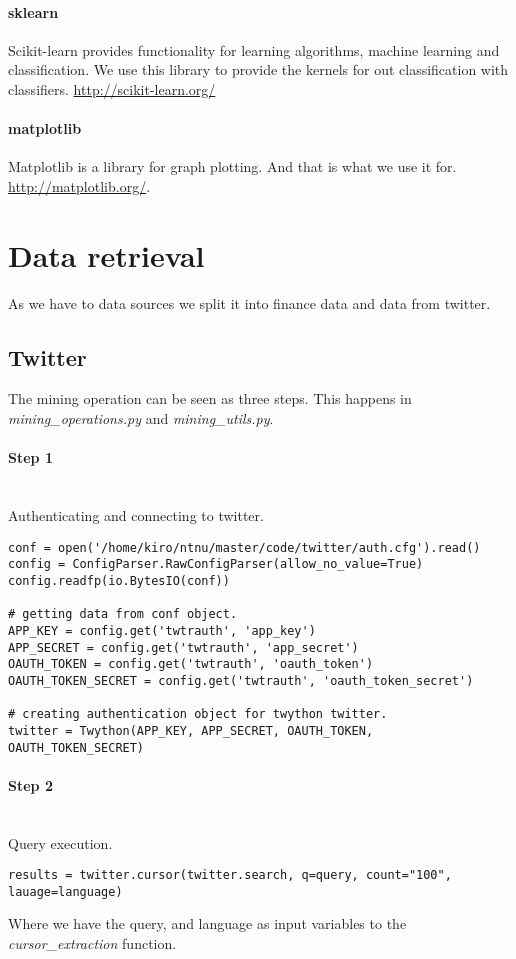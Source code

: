 \paragraph{sklearn}
Scikit-learn provides functionality for learning algorithms, machine learning
and classification. We use this library to provide the kernels for out
classification with classifiers. \url{http://scikit-learn.org/}

\paragraph{matplotlib}
Matplotlib is a library for graph plotting. And that is what we use it for.
\url{http://matplotlib.org/}.
 
\section{Data retrieval}\label{data:data_retrieval}
As we have to data sources we split it into finance data and data from twitter.

\subsection{Twitter}
The mining operation can be seen as three steps. This happens in
\textit{mining\_operations.py} and \textit{mining\_utils.py}.

\paragraph{Step 1}
\hspace{0pt}\\
Authenticating and connecting to twitter. 
\begin{verbatim}
conf = open('/home/kiro/ntnu/master/code/twitter/auth.cfg').read()
config = ConfigParser.RawConfigParser(allow_no_value=True)
config.readfp(io.BytesIO(conf))

# getting data from conf object.
APP_KEY = config.get('twtrauth', 'app_key')
APP_SECRET = config.get('twtrauth', 'app_secret')
OAUTH_TOKEN = config.get('twtrauth', 'oauth_token')
OAUTH_TOKEN_SECRET = config.get('twtrauth', 'oauth_token_secret')

# creating authentication object for twython twitter.
twitter = Twython(APP_KEY, APP_SECRET, OAUTH_TOKEN, OAUTH_TOKEN_SECRET)
\end{verbatim}

\paragraph{Step 2}
\hspace{0pt}\\
Query execution.
\begin{verbatim}
results = twitter.cursor(twitter.search, q=query, count="100", lauage=language)
\end{verbatim}
Where we have the query, and language as input variables to the
\textit{cursor\_extraction} function. 

